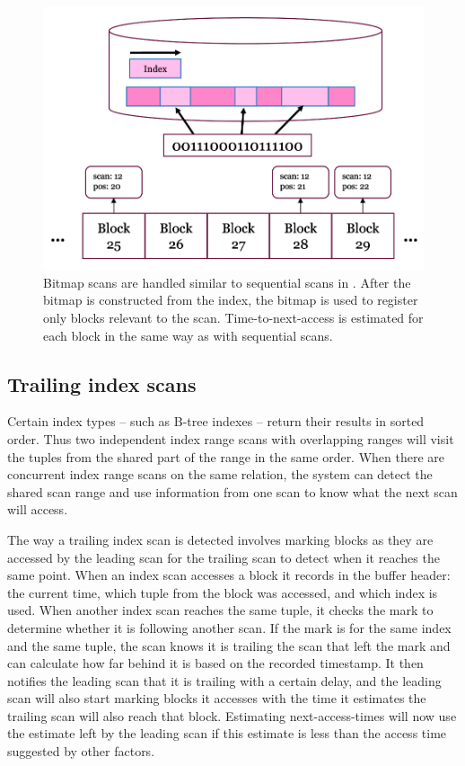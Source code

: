 \begin{figure}
    \centering
    \includegraphics[width=1\columnwidth]{figures/Diagrams/bitmap_scan_registered_progress.png}
    \caption[PBM bitmap scan tracking]{Bitmap scans are handled similar to sequential scans in . After the bitmap is constructed from the index, the bitmap is used to register only blocks relevant to the scan. Time-to-next-access is estimated for each block in the same way as with sequential scans.}
    \label{fig:bitmap_scan_tracking}
\end{figure}

\subsection{Trailing index scans}
\label{sec:idx_trailing}

Certain index types -- such as B-tree indexes -- return their results in sorted order. Thus two independent index range scans with overlapping ranges will visit the tuples from the shared part of the range in the same order. When there are concurrent index range scans on the same relation, the system can detect the shared scan range and use information from one scan to know what the next scan will access.

The way a trailing index scan is detected involves marking blocks as they are accessed by the leading scan for the trailing scan to detect when it reaches the same point. When an index scan accesses a block it records in the buffer header: the current time, which tuple from the block was accessed, and which index is used. When another index scan reaches the same tuple, it checks the mark to determine whether it is following another scan. If the mark is for the same index and the same tuple, the scan knows it is trailing the scan that left the mark and can calculate how far behind it is based on the recorded timestamp. It then notifies the leading scan that it is trailing with a certain delay, and the leading scan will also start marking blocks it accesses with the time it estimates the trailing scan will also reach that block. Estimating next-access-times will now use the estimate left by the leading scan if this estimate is less than the access time suggested by other factors.

